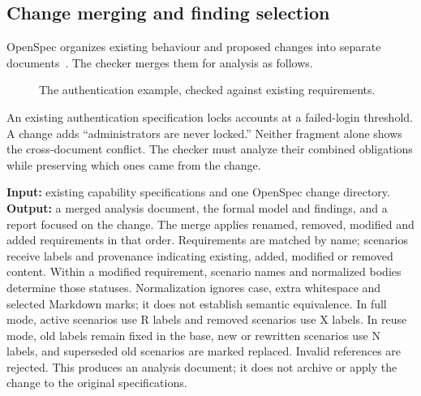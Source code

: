 \subsection{Change merging and finding selection}\label{app:change}
OpenSpec organizes existing behaviour and proposed changes into separate
documents~\citep{openspec}. The checker merges them for analysis as follows.

\begin{figure}[H]
\centering
\resizebox{\linewidth}{!}{}
\caption{The authentication example, checked against existing requirements.}
\end{figure}
An existing authentication specification locks accounts at a failed-login
threshold. A change adds ``administrators are never locked.'' Neither
fragment alone shows the cross-document conflict. The checker must analyze
their combined obligations while preserving which ones came from the
change.

\textbf{Input:} existing capability specifications and one OpenSpec change
directory. \textbf{Output:} a merged analysis document, the formal model
and findings, and a report focused on the change. The merge applies renamed,
removed, modified and added requirements in that order. Requirements are
matched by name; scenarios receive labels and provenance indicating existing,
added, modified or removed content. Within a modified requirement, scenario
names and normalized bodies determine those statuses. Normalization ignores
case, extra whitespace and selected Markdown marks; it does not establish
semantic equivalence. In full mode, active scenarios use R labels and removed
scenarios use X labels. In reuse mode, old labels remain fixed in the base,
new or rewritten scenarios use N labels, and superseded old scenarios are
marked replaced.
Invalid references are rejected. This produces an analysis document; it
does not archive or apply the change to the original specifications.

